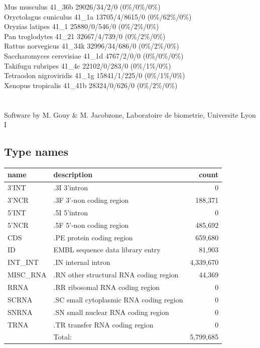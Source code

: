 \documentclass{article}
\begin{document}
\begin{Schunk}
Mus musculus                            41\_36b 29026/34/2/0 (0\%/0\%/0\%)\\
Oryctolagus cuniculus                   41\_1a 13705/4/8615/0 (0\%/62\%/0\%)\\
Oryzias latipes                         41\_1 25880/0/546/0 (0\%/2\%/0\%)\\
Pan troglodytes                         41\_21 32667/4/739/0 (0\%/2\%/0\%)\\
Rattus norvegicus                       41\_34k 32996/34/686/0 (0\%/2\%/0\%)\\
Saccharomyces cerevisiae                41\_1d 4767/2/0/0 (0\%/0\%/0\%)\\
Takifugu rubripes                       41\_4c 22102/0/283/0 (0\%/1\%/0\%)\\
Tetraodon nigroviridis                  41\_1g 15841/1/225/0 (0\%/1\%/0\%)\\
Xenopus tropicalis                      41\_41b 28324/0/626/0 (0\%/2\%/0\%)\\
\\
\\
Software by M. Gouy \& M. Jacobzone, Laboratoire de biometrie, Universite Lyon I

\subsection{Type names}
\noindent\begin{tabular}{llr}
\hline \hline
name & description & count \\
\hline
3'INT  &  .3I 3'intron  &  0 \\
3'NCR  &  .3F  3'-non coding region  &  188,371 \\
5'INT  &  .5I 5'intron  &  0 \\
5'NCR  &  .5F  5'-non coding region  &  485,692 \\
CDS  &  .PE protein coding region  &  659,680 \\
ID  &  EMBL sequence data library entry  &  81,903 \\
INT\_INT  &  .IN  internal intron  &  4,339,670 \\
MISC\_RNA  &  .RN other structural RNA coding region  &  44,369 \\
RRNA  &  .RR ribosomal RNA coding region  &  0 \\
SCRNA  &  .SC small cytoplasmic RNA coding region  &  0 \\
SNRNA  &  .SN small nuclear RNA coding region  &  0 \\
TRNA  &  .TR transfer RNA coding region  &  0 \\
\hline
 & Total: & 5,799,685 \\
\hline \hline
\end{tabular}


\end{Schunk}
\end{document}
